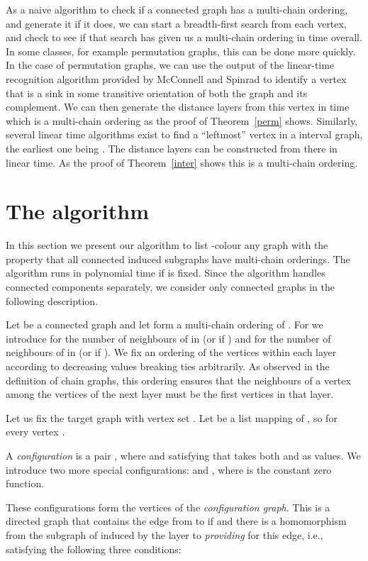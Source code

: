 \documentclass[12pt]{llncs}
\begin{document}
 As a naive algorithm to check if a connected graph has a multi-chain ordering,
 and generate it if it does, we can start a breadth-first search from
 each vertex, and check to see if that search has given us a
 multi-chain ordering in  time overall.  In some classes,
 for example permutation graphs, this can be done more quickly.  In
 the case of permutation graphs, we can use the output of the linear-time
 recognition algorithm provided by McConnell and Spinrad
 \cite{mcconnell} to  identify a vertex that is a sink in some
 transitive orientation of both the graph and its complement. We can
 then generate the distance layers from this vertex in  time which is
 a multi-chain ordering as the proof of Theorem~\ref{perm} shows. Similarly,
several linear time algorithms exist to find a ``leftmost'' vertex in a interval
 graph, the earliest one being \cite{BoL}. The distance layers can be constructed from there
 in linear time. As the proof of
 Theorem~\ref{inter} shows this is a multi-chain ordering.

\section{The algorithm}
In this section we present our algorithm to list -colour any graph with
the property that all connected induced subgraphs have multi-chain
orderings. The algorithm runs in polynomial time if  is fixed.
Since the algorithm handles connected components separately,
we consider only connected graphs in the following description.

Let  be a connected graph and let  form a multi-chain
ordering of . For  we introduce  for the number
of neighbours of  in  (or  if ) and  for
the number of neighbours of  in  (or  if ). We fix an
ordering of the vertices within each layer according to decreasing 
values breaking ties arbitrarily. 
As observed in the definition of chain graphs, this ordering ensures that the
neighbours of a vertex  among the vertices of the next layer
 must be the first  vertices in that layer.

Let us fix the target graph  with vertex set .
Let  be a list mapping of , so  for
every vertex .

A \emph{configuration} is a pair , where  and
 satisfying that  takes both  and
 as values. We introduce two more special configurations:
 and , where  is the constant
zero function.

These configurations form the vertices of the {\em configuration
graph}. This is a directed graph that contains the edge from
 to  if  and there
is a homomorphism  from the subgraph  of  induced by the
layer  to  {\em providing} for this edge, i.e.,
satisfying the following three conditions:
\end{document}
